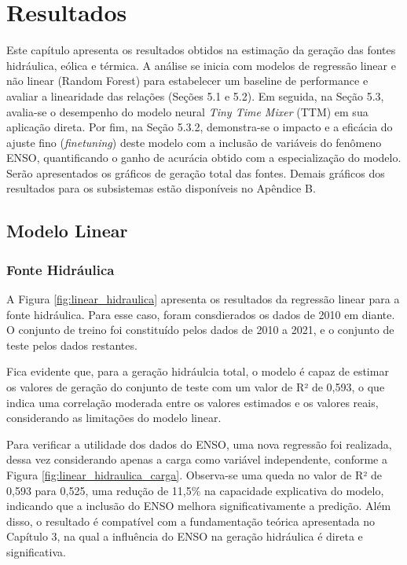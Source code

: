 \chapter{Resultados}
Este capítulo apresenta os resultados obtidos na estimação da geração das fontes hidráulica, eólica e térmica. A análise 
se inicia com modelos de regressão linear e não linear (Random Forest) para estabelecer um baseline de performance e 
avaliar a linearidade das relações (Seções 5.1 e 5.2). Em seguida, na Seção 5.3, avalia-se o desempenho do modelo 
neural \textit{Tiny Time Mixer} (TTM) em sua aplicação direta. Por fim, na Seção 5.3.2, demonstra-se o impacto e a 
eficácia do ajuste fino (\textit{finetuning}) deste modelo com a inclusão de variáveis do fenômeno ENSO, quantificando o ganho de 
acurácia obtido com a especialização do modelo. Serão apresentados os gráficos de geração total das fontes. Demais gráficos 
dos resultados para os subsistemas estão disponíveis no Apêndice B.

\section{Modelo Linear}
\subsection{Fonte Hidráulica}
A Figura \ref{fig:linear_hidraulica} apresenta os resultados da regressão linear para a fonte hidráulica. Para esse caso,
foram consdierados os dados de 2010 em diante. O conjunto de treino foi constituído pelos dados de 2010 a 2021, e o 
conjunto de teste pelos dados restantes. 

\begin{figure}[!ht]
  {}
  {}
\end{figure}
Fica evidente que, para a geração hidráulcia total, o modelo é capaz de estimar os valores de geração do conjunto de teste
com um valor de R² de 0,593, o que indica uma correlação moderada entre os valores estimados e os valores reais, considerando
as limitações do modelo linear. 

Para verificar a utilidade dos dados do ENSO, uma nova regressão foi realizada, dessa vez
considerando apenas a carga como variável independente, conforme a Figura \ref{fig:linear_hidraulica_carga}. Observa-se 
uma queda no valor de R² de 0,593 para 0,525, uma redução de 11,5\% na capacidade explicativa do modelo, indicando que a 
inclusão do ENSO melhora significativamente a predição. Além disso, o resultado é compatível com a fundamentação teórica 
apresentada no Capítulo 3, na qual a influência do ENSO na geração hidráulica é direta e significativa.

